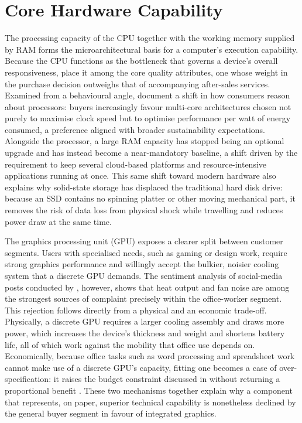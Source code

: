 \section{Core Hardware Capability}\label{app:theory-hardware}

The processing capacity of the CPU together with the working memory supplied by RAM forms
the microarchitectural basis for a computer's execution capability. Because the CPU
functions as the bottleneck that governs a device's overall responsiveness,
\textcite{kang_study_2022} place it among the core quality attributes, one whose weight in
the purchase decision outweighs that of accompanying after-sales services. Examined from a
behavioural angle, \textcite{liao_determinants_2022} document a shift in how consumers
reason about processors: buyers increasingly favour multi-core architectures chosen not
purely to maximise clock speed but to optimise performance per watt of energy consumed, a
preference aligned with broader sustainability expectations. Alongside the processor, a
large RAM capacity has stopped being an optional upgrade and has instead become a
near-mandatory baseline, a shift driven by the requirement to keep several cloud-based
platforms and resource-intensive applications running at once. This same shift toward
modern hardware also explains why solid-state storage has displaced the traditional hard
disk drive: because an SSD contains no spinning platter or other moving mechanical part, it
removes the risk of data loss from physical shock while travelling and reduces power draw
at the same time.

The graphics processing unit (GPU) exposes a clearer split between customer segments.
Users with specialised needs, such as gaming or design work, require strong graphics
performance and willingly accept the bulkier, noisier cooling system that a discrete GPU
demands. The sentiment analysis of social-media posts conducted by
\textcite{maghsoudi_hybrid_2026}, however, shows that heat output and fan noise are among
the strongest sources of complaint precisely within the office-worker segment. This
rejection follows directly from a physical and an economic trade-off. Physically, a
discrete GPU requires a larger cooling assembly and draws more power, which increases the
device's thickness and weight and shortens battery life, all of which work against the
mobility that office use depends on. Economically, because office tasks such as word
processing and spreadsheet work cannot make use of a discrete GPU's capacity, fitting one
becomes a case of over-specification: it raises the budget constraint discussed in
 without returning a proportional benefit
\parencite{rau_optimal_2018}. These two mechanisms together explain why a component that
represents, on paper, superior technical capability is nonetheless declined by the general
buyer segment in favour of integrated graphics.


